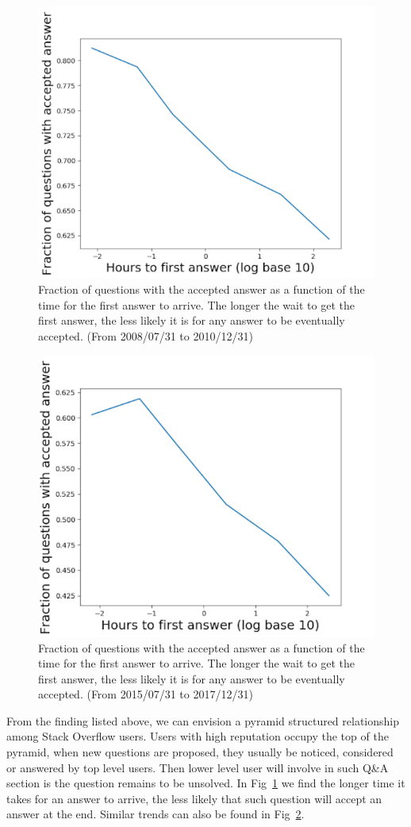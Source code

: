\begin{figure}[!t]
    \centering
    \includegraphics[width=0.7\columnwidth]{img/Fig2_2010.pdf}
    \caption{Fraction of questions with the accepted answer as a function of the time for the first answer to arrive. The longer the wait to get the first answer, the less likely it is for any answer to be eventually accepted. (From 2008/07/31 to 2010/12/31)}
    \label{fig:fig2_2010}
\end{figure}

\begin{figure}[!t]
    \centering
    \includegraphics[width=0.7\columnwidth]{img/Fig2_2017.pdf}
    \caption{Fraction of questions with the accepted answer as a function of the time for the first answer to arrive. The longer the wait to get the first answer, the less likely it is for any answer to be eventually accepted. (From 2015/07/31 to 2017/12/31)}
    \label{fig:fig2_2017}
\end{figure}
From the finding listed above, we can envision a pyramid structured relationship among Stack Overflow users.  Users with high reputation occupy the top of the pyramid, when new questions are proposed, they usually be noticed, considered or answered by top level users. Then lower level user will involve in such Q\&A section is the question remains to be unsolved. In Fig~\ref{fig:fig2_2010} we find the longer time it takes for an answer to arrive, the less likely that such question will accept an answer at the end. Similar trends can also be found in Fig~\ref{fig:fig2_2017}.


